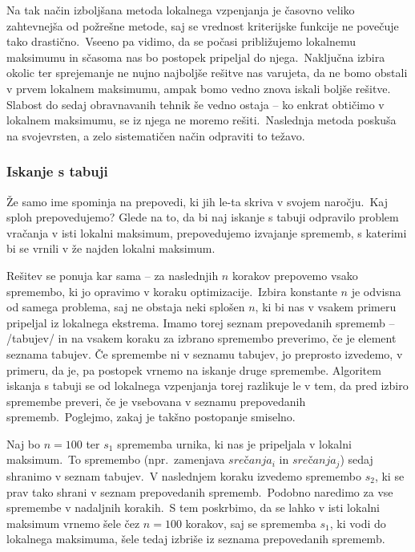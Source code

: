 \documentclass[a4paper,10pt]{article}
\begin{document}
Na tak način izboljšana metoda lokalnega vzpenjanja je časovno veliko zahtevnejša od
požrešne metode, saj se vrednost kriterijske funkcije ne povečuje tako drastično.\ Vseeno
pa vidimo, da se počasi približujemo lokalnemu maksimumu in sčasoma nas bo postopek
pripeljal do njega.\ Naključna izbira okolic ter sprejemanje ne nujno najboljše rešitve
nas varujeta, da ne bomo obstali v prvem lokalnem maksimumu, ampak bomo vedno znova
iskali boljše rešitve.
%
Slabost do sedaj obravnavanih tehnik še vedno ostaja -- ko enkrat obtičimo v lokalnem
maksimumu, se iz njega ne moremo rešiti.\ Naslednja metoda poskuša na svojevrsten, a zelo
sistematičen način odpraviti to težavo.

\subsubsection{Iskanje s tabuji} %

Že samo ime spominja na prepovedi, ki jih le-ta skriva v svojem naročju.\ Kaj sploh prepovedujemo?
Glede na to, da bi naj iskanje s tabuji odpravilo problem vračanja v isti lokalni maksimum,
prepovedujemo izvajanje sprememb, s katerimi bi se vrnili v že najden lokalni maksimum.

Rešitev se ponuja kar sama -- za naslednjih $n$ korakov prepovemo vsako spremembo, ki jo
opravimo v koraku optimizacije.\ Izbira konstante $n$ je odvisna od samega problema, saj
ne obstaja neki splošen $n$, ki bi nas v vsakem primeru pripeljal iz lokalnega ekstrema.
Imamo torej seznam prepovedanih sprememb -- /tabujev/ in na vsakem koraku za izbrano
spremembo preverimo, če je element seznama tabujev. Če spremembe ni v seznamu tabujev, jo
preprosto izvedemo, v primeru, da je, pa postopek vrnemo na iskanje druge spremembe.
Algoritem iskanja s tabuji se od lokalnega vzpenjanja torej razlikuje le v tem, da pred
izbiro spremembe preveri, če je vsebovana v seznamu prepovedanih sprememb.\ Poglejmo, zakaj
je takšno postopanje smiselno.

Naj bo $n = 100$ ter $s_1$ sprememba urnika, ki nas je pripeljala v lokalni maksimum.\ To
spremembo (npr.\ zamenjava $srečanja_i$ in $srečanja_j$) sedaj shranimo v
seznam tabujev.\ V naslednjem koraku izvedemo spremembo $s_2$, ki se prav tako shrani v
seznam prepovedanih sprememb.\ Podobno naredimo za vse spremembe v nadaljnih korakih.\ S
tem poskrbimo, da se lahko v isti lokalni maksimum vrnemo šele čez $n = 100$ korakov, saj
se sprememba $s_1$, ki vodi do lokalnega maksimuma, šele tedaj izbriše iz seznama
prepovedanih sprememb.
\end{document}
